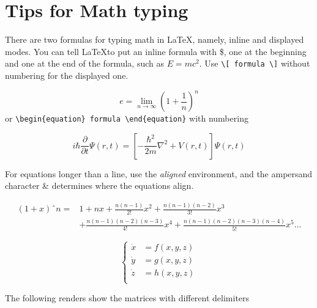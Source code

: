 \documentclass[12pt]{article}  %
\begin{document}
 \section{Tips for Math typing}
 
 There are two formulas for typing math in \LaTeX, namely, inline and displayed modes. You can tell \LaTeX to put an inline formula with \$, one at the beginning and one at the end of the formula, such as $E=mc^2$. Use \verb|\[ formula \]| without numbering for the displayed one.
  
  \[
  e=\lim_{n\to\infty} \left(1+\frac{1}{n}\right)^n
  \]
 or \verb|\begin{equation} formula \end{equation}| with numbering
 
 \begin{equation}\label{eq1}
     i\hbar\frac{\partial}{\partial t} \Psi(r,t)  = \left[
     -\frac{\hbar^2}{2m}\nabla^2+V(r,t) \right]\Psi(r,t) 
 \end{equation}
 
 For equations longer than a line, use the \textit{aligned} environment, and the ampersand character \& determines where the equations align.
 
 \begin{equation}\label{eq2}
     \begin{aligned}
         \left(1+x\right)ˆn  = &  1 + nx + \frac{n\left(n-1\right)}{2!}x^2 
         + \frac{n\left(n-1\right)\left(n-2\right)}{3!}x^3 
         \\& + \frac{n\left(n-1\right)\left(n-2\right)\left(n-3\right)}{4!}x^4 
         +  \frac{n\left(n-1\right)\left(n-2\right)\left(n-3\right)\left(n-4\right)}{5!}x^5 \ldots
     \end{aligned}
 \end{equation}
 
 \begin{equation}\label{eq3}
     \left\{
     \begin{aligned}
         \dot{x}&=f(x,y,z)\\
         \dot{y}&=g(x,y,z)\\
         \dot{z}&=h(x,y,z)\\
     \end{aligned}
     \right.
 \end{equation}
 
 The following renders show the matrices with different delimiters
 
\end{document}
